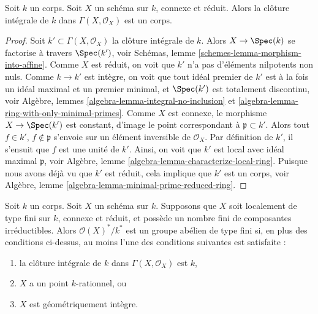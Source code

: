 \begin{lemma}
\label{lemma-integral-closure-ground-field}
 Soit $k$ un corps. Soit
$X$ un schéma sur $k$, connexe et réduit.
Alors la clôture intégrale de $k$ dans $\Gamma(X, \mathcal{O}_X)$
 est un corps. 
\end{lemma}

\begin{proof}
 Soit $k' \subset \Gamma(X, \mathcal{O}_X)$ la clôture intégrale de 
$k$. Alors $X \to \Spec(k)$ se factorise à travers $\Spec(k')$,
voir Schémas, lemme \ref{schemes-lemma-morphism-into-affine}.
Comme $X$ est réduit, on voit que $k'$ n'a pas d'éléments nilpotents non nuls. Comme 
$k \to k'$ est intègre, on voit que tout idéal premier de $k'$ est
à la fois un idéal maximal et un premier minimal,
et $\Spec(k')$ est totalement discontinu,
voir Algèbre, lemmes \ref{algebra-lemma-integral-no-inclusion} et 
\ref{algebra-lemma-ring-with-only-minimal-primes}.
Comme $X$ est connexe, le morphisme $X \to \Spec(k')$
 est constant, d'image le point correspondant à 
$\mathfrak p \subset k'$. Alors tout $f \in k'$, $f \not \in \mathfrak p$
 s'envoie sur un élément inversible de $\mathcal{O}_X$. Par définition
de $k'$, il s'ensuit que $f$ est une unité de $k'$. Ainsi, on voit
que $k'$ est local avec idéal maximal $\mathfrak p$,
voir Algèbre, lemme \ref{algebra-lemma-characterize-local-ring}.
Puisque nous avons déjà vu que $k'$ est réduit, cela implique que 
$k'$ est un corps,
voir Algèbre, lemme \ref{algebra-lemma-minimal-prime-reduced-ring}. 
\end{proof}

\begin{proposition}
\label{proposition-units-general}
 Soit $k$ un corps. Soit $X$ un schéma sur $k$. Supposons que $X$
 soit localement de type fini sur $k$, connexe et réduit, et possède un nombre
fini de composantes irréductibles. Alors $\mathcal{O}(X)^*/k^*$ est un groupe abélien
de type fini si, en plus des conditions ci-dessus, au
moins l'une des conditions suivantes est satisfaite : 
\begin{enumerate}
\item la clôture intégrale de $k$ dans $\Gamma(X, \mathcal{O}_X)$ est $k$, 
\item $X$ a un point $k$-rationnel, ou 
\item $X$ est géométriquement intègre. 
\end{enumerate}
\end{proposition}

